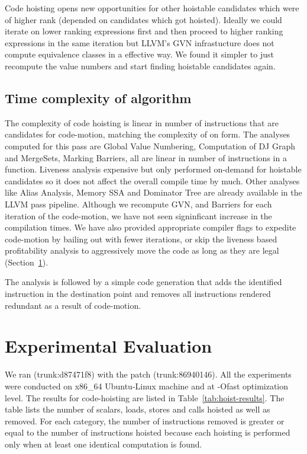 \documentclass[acmlarge,review]{acmart}\settopmatter{printfolios=true}
\begin{document}
Code hoisting opens new opportunities for other hoistable candidates which were
of higher rank (depended on candidates which got hoisted). Ideally we could
iterate on lower ranking expressions first and then proceed to higher ranking
expressions in the same iteration but LLVM's GVN infrastucture does not compute
equivalence classes in a effective way. We found it simpler to just recompute
the value numbers and start finding hoistable candidates again.

\subsection{Time complexity of algorithm}
The complexity of code hoisting is linear in number of instructions that are
candidates for code-motion, matching the complexity of \PRE{} on \SSA{} form.
The analyses computed for this pass are Global Value Numbering, Computation of
DJ Graph and MergeSets, Marking Barriers, all are linear in number of
instructions in a function. Liveness analysis expensive but only performed
on-demand for hoistable candidates so it does not affect the overall compile
time by much. Other analyses like Alias Analysis, Memory SSA and Dominator Tree
are already available in the LLVM pass pipeline. Although we recompute GVN, and
Barriers for each iteration of the code-motion, we have not seen signinficant
increase in the compilation times. We have also provided appropriate compiler
flags to expedite code-motion by bailing out with fewer iterations, or skip the
liveness based profitability analysis to aggressively move the code as long as
they are legal (Section~\ref{sec:experimental-results}).

The analysis is followed by a simple code generation that adds the identified
instruction in the destination point and removes all instructions rendered
redundant as a result of code-motion.


\section{Experimental Evaluation}
\label{sec:experimental-results}
We ran \LLVMTestSuite{} (trunk:d87471f8) with the patch (trunk:86940146). All
the experiments were conducted on x86\_64 Ubuntu-Linux machine and at -Ofast
optimization level.  The results for code-hoisting are listed in
Table~\ref{tab:hoist-results}. The table lists the number of scalars, loads,
stores and calls hoisted as well as removed. For each category, the number of
instructions removed is greater or equal to the number of instructions hoisted
because each hoisting is performed only when at least one identical computation
is found.
\end{document}

